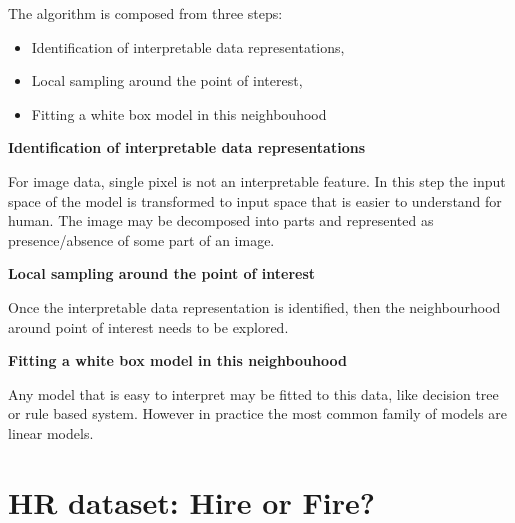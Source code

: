 \documentclass[]{book}
\providecommand{\tightlist}{%
  \setlength{\itemsep}{0pt}\setlength{\parskip}{0pt}}
\theoremstyle{definition}
\theoremstyle{definition}
\theoremstyle{definition}
\theoremstyle{remark}
\begin{document}
The algorithm is composed from three steps:

\begin{itemize}
\tightlist
\item
  Identification of interpretable data representations,
\item
  Local sampling around the point of interest,
\item
  Fitting a white box model in this neighbouhood
\end{itemize}

\textbf{Identification of interpretable data representations}

For image data, single pixel is not an interpretable feature. In this
step the input space of the model is transformed to input space that is
easier to understand for human. The image may be decomposed into parts
and represented as presence/absence of some part of an image.

\textbf{Local sampling around the point of interest}

Once the interpretable data representation is identified, then the
neighbourhood around point of interest needs to be explored.

\textbf{Fitting a white box model in this neighbouhood}

Any model that is easy to interpret may be fitted to this data, like
decision tree or rule based system. However in practice the most common
family of models are linear models.

\hypertarget{hr-dataset-hire-or-fire-2}{%
\section{HR dataset: Hire or Fire?}\label{hr-dataset-hire-or-fire-2}}
\end{document}
